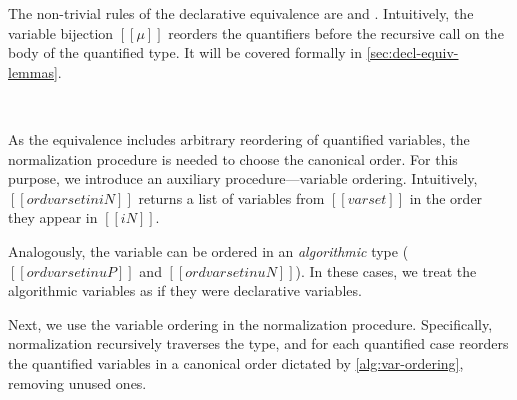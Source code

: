 The non-trivial rules of the declarative equivalence are
 and .
Intuitively, the variable bijection $[[μ]]$ reorders the quantifiers before
the recursive call on the body of the quantified type. 
It will be covered formally in \cref{sec:decl-equiv-lemmas}.

\begin{definition}
  \hfill
  
  \begin{multicols}{2}
  \ottdefnEOneNeqLabeled[\apppref]{}
  \columnbreak\\
  \ottdefnEOnePeqLabeled[\apppref]{}
  \end{multicols}

\end{definition}

As the equivalence includes arbitrary reordering of quantified variables,
the normalization procedure is needed to choose the canonical order.
For this purpose, we introduce an auxiliary procedure---variable ordering. 
Intuitively, $[[ord varset in iN]]$ returns a list of variables from $[[varset]]$
in the order they appear in $[[iN]]$.

\begin{algorithm}
  \label{alg:var-ordering}
  \hfill
  
  \ottdefnONVarLabeled[\apppref]{}
  \newpage
  \ottdefnOPVarLabeled[\apppref]{}

  Analogously, the variable can be ordered in 
  an \emph{algorithmic} type ($[[ord varset in uP]]$ and 
  $[[ord varset in uN]]$). In these cases, we treat the algorithmic variables
  as if they were declarative variables.

\end{algorithm}

Next, we use the variable ordering in the normalization procedure. 
Specifically, normalization recursively traverses the type, 
and for each quantified case reorders the quantified variables in a 
canonical order dictated by \cref{alg:var-ordering}, removing unused ones.

